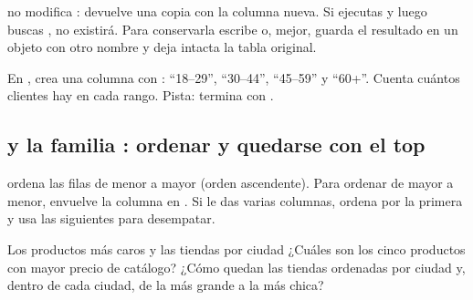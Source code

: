 \begin{advertencia}
 no modifica : devuelve una copia con la
columna nueva. Si ejecutas 
y luego buscas , no existirá. Para conservarla escribe
 o, mejor, guarda el resultado
en un objeto con otro nombre y deja intacta la tabla original.
\end{advertencia}

\begin{hazlotu}
En , crea una columna  con
: ``18--29'', ``30--44'', ``45--59'' y ``60+''. Cuenta
cuántos clientes hay en cada rango. Pista: termina con
.
\end{hazlotu}

\subsection{\texorpdfstring{}{arrange()} y la familia \texorpdfstring{}{slice\_*()}: ordenar y quedarse con el top}
\label{sec:m2-arrange}

 ordena las filas de menor a mayor (orden ascendente). Para
ordenar de mayor a menor, envuelve la columna en . Si le das
varias columnas, ordena por la primera y usa las siguientes para desempatar.

\begin{ejemplo}{Los productos más caros y las tiendas por ciudad}
¿Cuáles son los cinco productos con mayor precio de catálogo? ¿Cómo quedan
las tiendas ordenadas por ciudad y, dentro de cada ciudad, de la más grande
a la más chica?
\end{ejemplo}

